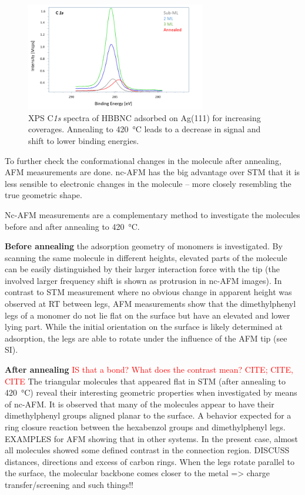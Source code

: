\begin{figure}[] \centering
	\includegraphics[width=0.7\textwidth]{./images/hbbnc-xps1}
	\caption{XPS C\textit{1s} spectra of HBBNC adsorbed on Ag(111) for increasing coverages. Annealing to \SI{420}{\celsius} leads to a decrease in signal and shift to lower binding energies.}
	\label{}
\end{figure}

To further check the conformational changes in the molecule after annealing, AFM measurements are done. nc-AFM has the big advantage over STM that it is less sensible to electronic changes in the molecule – more closely resembling the true geometric shape.

Nc-AFM measurements are a complementary method to investigate the molecules before and after annealing to \SI{420}{\celsius}. 

\textbf{Before annealing} the adsorption geometry of monomers is investigated. By scanning the same molecule in different heights, elevated parts of the molecule can be easily distinguished by their larger interaction force with the tip (the involved larger frequency shift is shown as protrusion in nc-AFM images). In contrast to STM measurement where no obvious change in apparent height was observed at RT between legs, AFM measurements show that the dimethylphenyl legs of a monomer do not lie flat on the surface but have an elevated and lower lying part. While the initial orientation on the surface is likely determined at adsorption, the legs are able to rotate under the influence of the AFM tip (see SI).

\textbf{After annealing} \textcolor{red}{IS that a bond? What does the contrast mean? CITE; CITE, CITE}
The triangular molecules that appeared flat in STM (after annealing to \SI{420}{\celsius}) reveal their interesting geometric properties when investigated by means of nc-AFM. It is observed that many of the molecules appear to have their dimethylphenyl groups aligned planar to the surface. A behavior expected for a ring closure reaction between the hexabenzol groups and dimethylphenyl legs. EXAMPLES for AFM showing that in other systems. In the present case, almost all molecules showed some defined contrast in the connection region. DISCUSS distances, directions and excess of carbon rings.
When the legs rotate parallel to the surface, the molecular backbone comes closer to the metal => charge transfer/screening and such things!!


